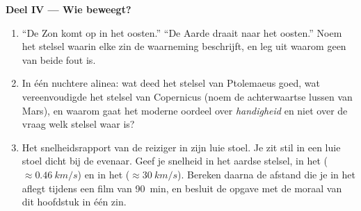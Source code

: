 \begin{problem}
\medskip
\noindent\textbf{Deel IV --- Wie beweegt?}
\begin{enumerate}[resume]
  \item ``De Zon komt op in het oosten.'' ``De Aarde draait naar het
        oosten.'' Noem het stelsel waarin elke zin de waarneming
        beschrijft, en leg uit waarom geen van beide fout is.
  \item In één nuchtere alinea: wat deed het stelsel van Ptolemaeus goed,
        wat vereenvoudigde het stelsel van Copernicus (noem de
        achterwaartse lussen van Mars), en waarom gaat het moderne
        oordeel over \emph{handigheid} en niet over de vraag welk stelsel
        waar is?
  \item Het snelheidsrapport van de reiziger in zijn luie stoel. Je zit
        stil in een luie stoel dicht bij de evenaar. Geef je snelheid in
        het aardse stelsel, in het 
        ($\approx \qty{0.46}{km/s}$) en in het 
        ($\approx \qty{30}{km/s}$). Bereken daarna de afstand die je in
        het  aflegt tijdens een film van
        \qty{90}{min}, en besluit de opgave met de moraal van dit
        hoofdstuk in één zin.
\end{enumerate}
\end{problem}
